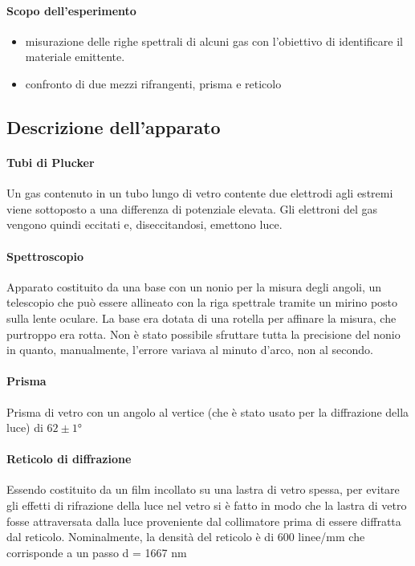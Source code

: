 \paragraph{Scopo dell'esperimento }

\begin{itemize}
    
    \item misurazione delle righe spettrali di alcuni gas con l'obiettivo di identificare il materiale emittente.
    
    \item confronto di due mezzi rifrangenti, prisma e reticolo
    
\end{itemize}
%
%
%
\subsection{Descrizione dell'apparato }
%
\paragraph{Tubi di Plucker}{Un gas contenuto in un tubo lungo di vetro contente due elettrodi agli estremi viene sottoposto a una differenza di potenziale elevata. Gli elettroni del gas vengono quindi eccitati e, diseccitandosi, emettono luce.}
\paragraph{Spettroscopio}{Apparato costituito da una base con un nonio per la misura degli angoli, un telescopio che può essere allineato con la riga spettrale tramite un mirino posto sulla lente oculare.
La base era dotata di una rotella per affinare la misura, che purtroppo era rotta. Non è stato possibile sfruttare tutta la precisione del nonio in quanto, manualmente, l'errore variava al minuto d'arco, non al secondo.}
\paragraph{Prisma}{Prisma di vetro con un angolo al vertice (che è stato usato per la diffrazione della luce) di $62 \pm 1 °$}
\paragraph{Reticolo di diffrazione}{Essendo costituito da un film incollato su una lastra di vetro spessa, per evitare gli effetti di rifrazione
della luce nel vetro si è fatto in modo che la lastra di vetro fosse attraversata
dalla luce proveniente dal collimatore prima di essere diffratta dal reticolo. Nominalmente, la densità del reticolo è di 600 linee/mm che corrisponde a un passo d = 1667 nm}

